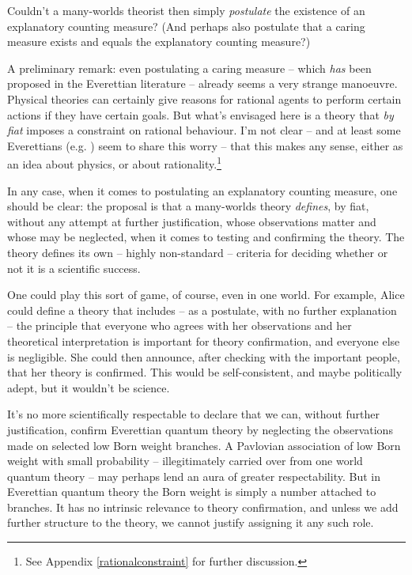 \documentclass[aps,
pra,epsfig,12pt,nofootinbib]{revtex4}
\begin{document}
Couldn't a many-worlds theorist then simply {\it postulate}
the existence of an explanatory counting measure?   (And perhaps also  
postulate that a caring measure exists and equals the explanatory
counting measure?) 

A preliminary remark: even postulating a caring measure -- which 
{\it has} been 
proposed \cite{papineauvol} in the Everettian literature -- already
seems a very strange manoeuvre.  Physical theories can certainly give 
reasons for rational agents to perform certain actions if they
have certain goals.   But what's envisaged here is a theory
that {\it by fiat} imposes a constraint on rational behaviour.  I'm 
not clear -- and at least some Everettians (e.g. \cite{saundersvol})
seem to share this worry -- 
that this makes any sense, either as an idea about
physics, or about rationality.\footnote{See Appendix \ref{rationalconstraint}
for further discussion.}

In any case, when it comes to postulating an explanatory
counting measure, one should be clear: the proposal is  
that a many-worlds theory {\it defines}, by fiat, without any attempt
at further justification, whose observations matter and whose may
be neglected, when it comes to testing and confirming the theory.  
The theory defines its own -- highly 
non-standard -- criteria for deciding whether or not it is
a scientific success.  

One could play this sort of game, of course, even in one world.  
For example,
Alice could define a theory that includes -- as a postulate, with no further 
explanation -- the principle that everyone who agrees 
with her observations and her theoretical interpretation is important
for theory confirmation, and everyone else is negligible.   
She could then announce, after checking with the important people, that 
her theory is confirmed.
This would be self-consistent, and maybe politically adept, but it 
wouldn't be science.  

It's no more scientifically respectable to declare that we can, without
further justification, confirm Everettian quantum theory by 
neglecting the observations made on selected low Born weight branches.
A Pavlovian association of low Born weight 
with small probability --  illegitimately carried
over from one world quantum theory -- may perhaps lend an
aura of greater respectability.   
But in Everettian quantum theory the Born weight is 
simply a number attached to branches.  
It has no intrinsic relevance to theory confirmation, and unless we add 
further structure to the theory, we cannot justify assigning it any such 
role.   
\end{document}
